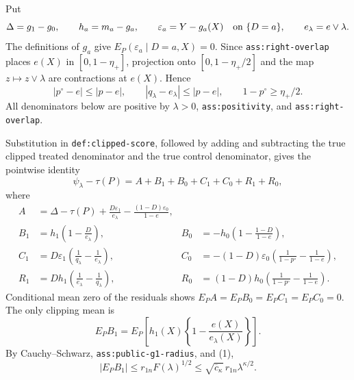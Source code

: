 Put
\[
\Delta=g_1-g_0,\qquad h_a=m_a-g_a,
\qquad \varepsilon_a=Y-g_a(X)\quad\hbox{on }\{D=a\},
\qquad e_\lambda=e\vee\lambda.
\]
The definitions of \(g_a\) give
\(E_P(\varepsilon_a\mid D=a,X)=0\).  Since
\texttt{ass:right-overlap} places \(e(X)\) in
\([0,1-\eta_+]\), projection onto \([0,1-\eta_+/2]\) and the map
\(z\mapsto z\vee\lambda\) are contractions at \(e(X)\).  Hence
\[
|p^\circ-e|\leq|p-e|,
\qquad |q_\lambda-e_\lambda|\leq|p-e|,
\qquad 1-p^\circ\geq\eta_+/2.                                      \tag{4}
\]
All denominators below are positive by \(\lambda>0\),
\texttt{ass:positivity}, and \texttt{ass:right-overlap}.

Substitution in \texttt{def:clipped-score}, followed by adding and subtracting
the true clipped treated denominator and the true control denominator, gives
the pointwise identity
\[
\psi_\lambda-\tau(P)=A+B_1+B_0+C_1+C_0+R_1+R_0,                    \tag{5}
\]
where
\[
\begin{aligned}
A&=\Delta-\tau(P)+\frac{D\varepsilon_1}{e_\lambda}
-\frac{(1-D)\varepsilon_0}{1-e},\\
B_1&=h_1\left(1-\frac D{e_\lambda}\right),
&B_0&=-h_0\left(1-\frac{1-D}{1-e}\right),\\
C_1&=D\varepsilon_1\left(\frac1{q_\lambda}-\frac1{e_\lambda}\right),
&C_0&=-(1-D)\varepsilon_0
\left(\frac1{1-p^\circ}-\frac1{1-e}\right),\\
R_1&=Dh_1\left(\frac1{e_\lambda}-\frac1{q_\lambda}\right),
&R_0&=(1-D)h_0
\left(\frac1{1-p^\circ}-\frac1{1-e}\right).
\end{aligned}                                                       \tag{6}
\]
Conditional mean zero of the residuals shows
\(E_PA=E_PB_0=E_PC_1=E_PC_0=0\).  The only clipping mean is
\[
E_PB_1
=E_P\!\left[h_1(X)\left\{1-\frac{e(X)}{e_\lambda(X)}\right\}\right].
\]
By Cauchy--Schwarz, \texttt{ass:public-g1-radius}, and (1),
\[
|E_PB_1|
\leq r_{1n}F(\lambda)^{1/2}
\leq\sqrt{\overline c_\kappa}\,r_{1n}\lambda^{\kappa/2}.          \tag{7}
\]

